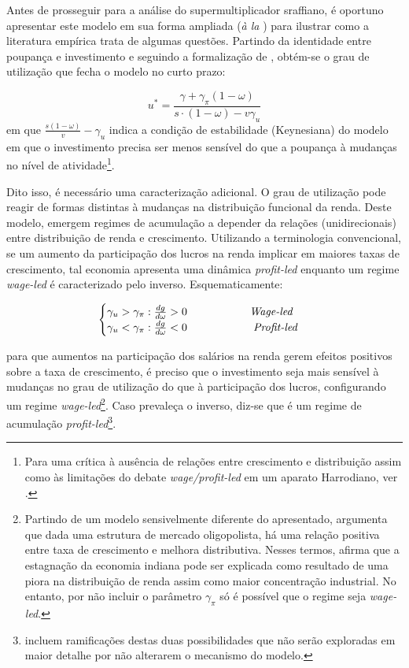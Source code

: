 Antes de prosseguir para a análise do supermultiplicador sraffiano, é oportuno apresentar este modelo em sua forma ampliada (\textit{à la} \textcite{bhaduri_unemployment_1990}) para ilustrar como a literatura empírica trata de algumas questões. Partindo da identidade entre poupança e investimento e seguindo a formalização de \textcite[Cap, 6]{lavoie_post-keynesian_2015}, obtém-se o grau de utilização que fecha o modelo no curto prazo:

\begin{equation}
\label{KaleckiSR}
    u^{*} = \frac{\gamma + \gamma_{\pi}(1-\omega)}{s\cdot (1-\omega) - v\gamma_u}
\end{equation}
em que $\frac{s(1-\omega)}{v} - \gamma_u$ indica a condição de estabilidade (Keynesiana) do modelo em que o investimento precisa ser menos sensível do que a poupança à mudanças no nível de atividade\footnote{Para uma crítica à ausência de relações entre crescimento e distribuição assim como às limitações do debate \textit{wage/profit-led} em um aparato
Harrodiano, 
ver 
\textcite{skott_weaknesses_2017}.}.

Dito isso, é necessário uma  caracterização adicional. O grau de utilização pode reagir de formas distintas à mudanças na distribuição funcional da renda. Deste modelo, emergem regimes de acumulação a depender da relações (unidirecionais) entre distribuição de renda e crescimento. Utilizando a terminologia convencional, se um aumento da participação dos lucros na renda implicar em maiores taxas de crescimento, tal economia apresenta uma dinâmica \textit{profit-led} enquanto um regime \textit{wage-led} é caracterizado pelo inverso. Esquematicamente:

\begin{center}
$$
\begin{cases}
\gamma_u > \gamma_{\pi}:\frac{dg}{d\omega} > 0\hspace{2cm} \text{\textit{Wage-led}}\\
\gamma_u < \gamma_{\pi}:\frac{dg}{d\omega} < 0 \hspace{2cm} \text{          \textit{Profit-led}}
\end{cases}
$$
\end{center}
para que aumentos na participação dos salários na renda gerem efeitos positivos sobre a taxa de crescimento, é preciso que o investimento seja mais sensível à mudanças no grau de utilização do que à participação dos lucros, configurando um regime \textit{wage-led}\footnote{
Partindo de um modelo sensivelmente diferente do apresentado, \textcite{dutt_stagnation_1984} argumenta que dada uma estrutura de mercado oligopolista, há uma relação positiva entre taxa de crescimento e melhora distributiva. Nesses termos, afirma que a estagnação da economia indiana pode ser explicada como resultado de uma piora na distribuição de renda assim como maior concentração industrial. No entanto, por não incluir o parâmetro $\gamma_\pi$ só é possível que o regime seja \textit{wage-led}.}.  Caso prevaleça o inverso, diz-se que é um regime de acumulação \textit{profit-led}\footnote{\textcite{bhaduri_unemployment_1990} incluem ramificações destas duas possibilidades que não serão exploradas em maior detalhe por não alterarem o mecanismo do modelo.}.


